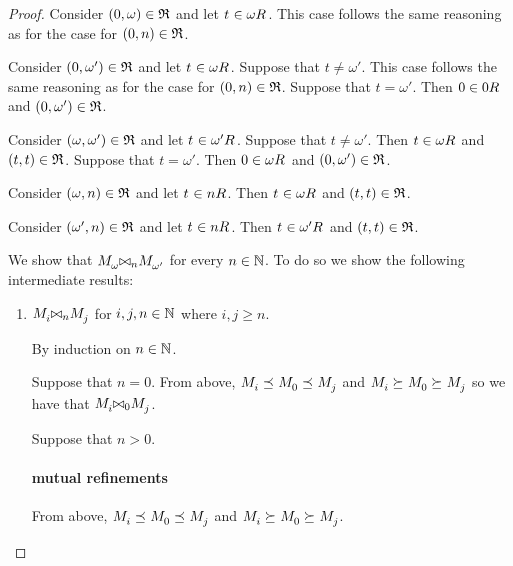 \begin{proof}
Consider $(0, \omega) \in \mathfrak{R}$ and let $\kStateT \in \kSuccessors{}{\omega}$. 
This case follows the same reasoning as for the case for $(0, n) \in \mathfrak{R}$.

Consider $(0, \omega') \in \mathfrak{R}$ and let $\kStateT \in \kSuccessors{}{\omega}$. 
Suppose that $t \neq \omega'$. 
This case follows the same reasoning as for the case for $(0, n) \in \mathfrak{R}$. 
Suppose that $t = \omega'$. 
Then $0 \in \kSuccessors{}{0}$ and $(0, \omega') \in \mathfrak{R}$.

Consider $(\omega, \omega') \in \mathfrak{R}$ and let $\kStateT \in \kSuccessors{}{\omega'}$. 
Suppose that $t \neq \omega'$. 
Then $t \in \kSuccessors{}{\omega}$ and $(t, t) \in \mathfrak{R}$. 
Suppose that $t = \omega'$. 
Then $0 \in \kSuccessors{}{\omega}$ and $(0, \omega') \in \mathfrak{R}$.

Consider $(\omega, n) \in \mathfrak{R}$ and let $\kStateT \in \kSuccessors{}{n}$.
Then $\kStateT \in \kSuccessors{}{\omega}$ and $(t, t) \in \mathfrak{R}$.

Consider $(\omega', n) \in \mathfrak{R}$ and let $\kStateT \in \kSuccessors{}{n}$.
Then $\kStateT \in \kSuccessors{}{\omega'}$ and $(t, t) \in \mathfrak{R}$.

We show that $\kPModel{\omega} \bisimref[n] \kPModel{\omega'}$ for every $n \in \mathbb{N}$. 
To do so we show the following intermediate results:

\begin{enumerate}
    \item $\kPModel{i} \bisimref[n] \kPModel{j}$ for $i, j, n \in \mathbb{N}$ where $i, j \geq n$.

    By induction on $n \in \mathbb{N}$.

    Suppose that $n = 0$. 
    From above, $\kPModel{i} \refines \kPModel{0} \refines \kPModel{j}$
    and $\kPModel{i} \simulates \kPModel{0} \simulates \kPModel{j}$
    so we have that $\kPModel{i} \bisimref[0] \kPModel{j}$.

    Suppose that $n > 0$.

    \paragraph{mutual refinements} From above, $\kPModel{i} \refines \kPModel{0} \refines \kPModel{j}$
    and $\kPModel{i} \simulates \kPModel{0} \simulates \kPModel{j}$.


\end{enumerate}
\end{proof}
